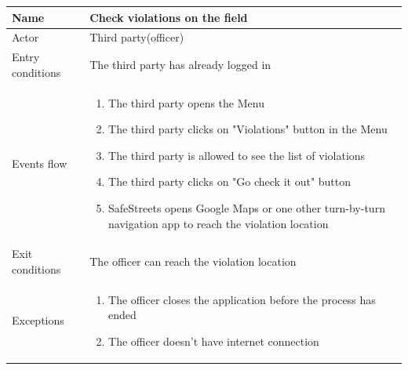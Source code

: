 \documentclass{article}
\begin{document}
\begin{table}[H]
    \begin{tabular}{|l|l|}
    \hline
    Name & \begin{minipage}[t]{0.7\textwidth}\textbf{Check violations on the field} \end{minipage} \\ \hline  
    Actor & \begin{minipage}[t]{0.7\textwidth} Third party(officer) \end{minipage} \\ \hline 
    Entry conditions & \begin{minipage}[t]{0.7\textwidth}The third party has
    already logged in \end{minipage} \\
    \hline 
    Events flow & \begin{minipage}[t]{0.7\textwidth} 
    \begin{enumerate}
        \item The third party opens the Menu
        \item The third party clicks on "Violations" button in the Menu
        \item The third party is allowed to see the list of violations
        \item The third party clicks on "Go check it out" button
        \item SafeStreets opens Google Maps or one other turn-by-turn navigation
        app to reach the violation location
    \end{enumerate}
    \end{minipage} \\ \hline
    Exit conditions & \begin{minipage}[t]{0.7\textwidth} The officer can reach
    the violation location\end{minipage} \\
    \hline
    Exceptions & \begin{minipage}[t]{0.7\textwidth} 
    \begin{enumerate}
        \item The officer closes the application before the process has ended
        \item The officer doesn't have internet connection 
    \end{enumerate}    
    \end{minipage} \\ \hline
    \end{tabular}
\end{table}
\end{document}
